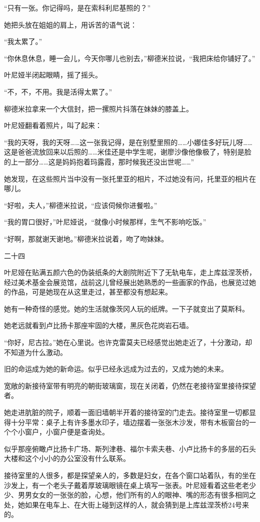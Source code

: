 “只有一张。你记得吗，是在索科利尼基照的？”

她把头放在姐姐的肩上，用诉苦的语气说：

“我太累了。”

“你休息休息，睡一会儿，今天你哪儿也别去，”柳德米拉说，“我把床给你铺好了。”

叶尼娅半闭起眼睛，摇了摇头。

“不，不，不用。我是活得太累了。”

柳德米拉拿来一个大信封，把一摞照片抖落在妹妹的膝盖上。

叶尼娅翻看着照片，叫了起来：

“我的天呀，我的天呀……这一张我记得，是在别墅里照的……小娜佳多好玩儿呀……这是爸爸流放回来以后照的……米佳还是中学生呢，谢廖沙像他像极了，特别是脸的上一部分……这是妈妈抱着玛露霞，那时候我还没出世呢……”

她发现，在这些照片当中没有一张托里亚的相片，不过她没有问，托里亚的相片在哪儿。

“好啦，夫人，”柳德米拉说，“应该伺候你进餐啦。”

“我的胃口很好，”叶尼娅说，“就像小时候那样，生气不影响吃饭。”

“好啊，那就谢天谢地。”柳德米拉说着，吻了吻妹妹。

二十四

叶尼娅在贴满五颜六色的伪装纸条的大剧院附近下了无轨电车，走上库兹涅茨桥，经过美术基金会展览馆，战前这儿曾经展出她熟悉的一些画家的作品，也展览过她的作品，可是她现在从这里走过，甚至都没有想起来。

她有一种奇怪的感觉。她的生活就像茨冈人玩的纸牌。一下子就变出了莫斯科。

她老远就看到卢比扬卡那座牢固的大楼，黑灰色花岗岩石墙。

“你好，尼古拉。”她在心里说。也许克雷莫夫已经感觉出她走近了，十分激动，却不知道为什么激动。

旧的命运成为她的新命运。似乎已经永远成为过去的，又成为她的未来。

宽敞的新接待室带有明亮的朝街玻璃窗，现在关闭着，仍然在老接待室里接待探望者。

她走进肮脏的院子，顺着一面旧墙朝半开着的接待室的门走去。接待室里一切都显得十分平常：桌子上有许多墨水印子，墙边摆着一张张木沙发，带有木板窗台的一个个小窗户，小窗户便是查询处。

似乎那座俯瞰卢比扬卡广场、斯列津巷、福尔卡索夫巷、小卢比扬卡的多层的石头大楼和这个小小的办公室没有什么联系。

接待室里的人很多，都是探望亲人的，多数是妇女，在各个窗口站着队，有的坐在沙发上，有一个老头子戴着厚玻璃眼镜在桌上填写一张表。叶尼娅看着这些老老少少、男男女女的一张张的脸，心想，他们所有的人的眼神、嘴的形态有很多相同之处，她如果在电车上、在大街上碰到这样的人，就会猜到是上库兹涅茨桥24号来的。


